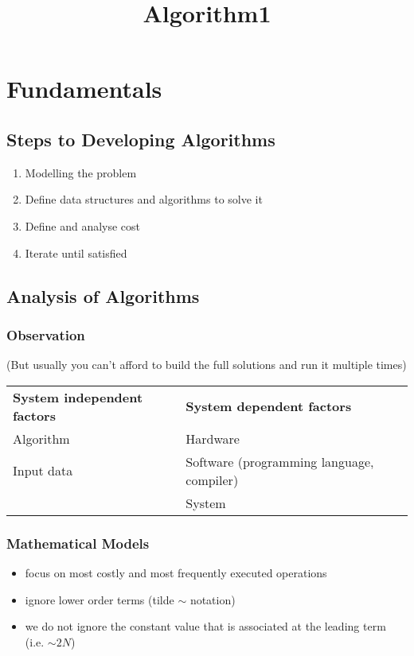 \documentclass[a4paper]{article}
\title{\textbf{Algorithm1}}
\begin{document}
\maketitle
\thispagestyle{empty}
\pagebreak



\tableofcontents
{}
\pagebreak

\section{Fundamentals}
\subsection{Steps to Developing Algorithms}
\begin{enumerate}
    \item Modelling the problem
    \item Define data structures and algorithms to solve it
    \item Define and analyse cost
    \item Iterate until satisfied
\end{enumerate}

\subsection{Analysis of Algorithms}
\subsubsection*{Observation} (But usually you can't afford to build the full solutions and run it multiple times)
\begin{spacing}{1.5}
\begin{tabularx}{0.9\textwidth}{X|X}
    \hline
    \textbf{System independent factors} & \textbf{System dependent factors} \\
    \cline{1-1}\cline{2-2}
    Algorithm & Hardware \\
    Input data & Software (programming language, compiler) \\
    & System\\
    \hline
\end{tabularx}
\end{spacing}
\subsubsection*{Mathematical Models}
\begin{itemize}
    \item focus on most costly and most frequently executed operations
    \item ignore lower order terms (tilde $\sim$ notation)
    \item we do not ignore the constant value that is associated at the leading term (i.e. $\sim 2N$)
\end{itemize}
\end{document}
